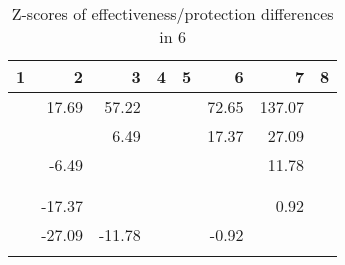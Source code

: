 \begin{table}[ht]
\centering
\begin{tabular}{rrrrrrrr}
  \hline
1 & 2 & 3 & 4 & 5 & 6 & 7 & 8 \\ 
  \hline
 & 17.69 & 57.22 &  &  & 72.65 & 137.07 &  \\ 
   &  & 6.49 &  &  & 17.37 & 27.09 &  \\ 
   & -6.49 &  &  &  &  & 11.78 &  \\ 
   &  &  &  &  &  &  &  \\ 
   &  &  &  &  &  &  &  \\ 
   & -17.37 &  &  &  &  & 0.92 &  \\ 
   & -27.09 & -11.78 &  &  & -0.92 &  &  \\ 
   &  &  &  &  &  &  &  \\ 
   \hline
\end{tabular}
\caption{Z-scores of effectiveness/protection differences in  6} 
\end{table}
